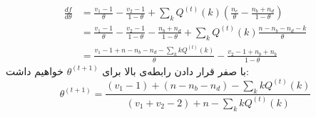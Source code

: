 \documentclass[a4paper, 12pt]{article}
\begin{document}
\begin{enumerate}
	\[
	\begin{aligned}
		\frac{d f}{d\theta} &= \frac{v_1-1}{\theta} - \frac{v_2-1}{1-\theta} + \sum_k Q^{(t)}(k)\left(\frac{n_c}{\theta} - \frac{n_b+n_d}{1-\theta}\right) \\[0.5em]
		&= \frac{v_1-1}{\theta} - \frac{v_2-1}{1-\theta} - \frac{n_b+n_d}{1-\theta} + \sum_k Q^{(t)}(k) \frac{n - n_b - n_d - k}{\theta} \\[0.5em]
		&= \frac{v_1-1 + n - n_b - n_d - \sum_k kQ^{(t)}(k)}{\theta}- \frac{v_2-1+n_b+n_b}{1 - \theta}
	\end{aligned}
	\]
	با صفر قرار دادن رابطه‌ی بالا برای
	$\theta^{(t+1)}$
	خواهیم داشت:
	\[
	\boxed{
	\theta^{(t+1)} = \frac{(v_1-1) + (n-n_b-n_d) - \sum_k kQ^{(t)}(k)}{(v_1+v_2-2) + n - \sum_k kQ^{(t)}(k)}
	}
	\]
\end{enumerate}
	
\end{document}
